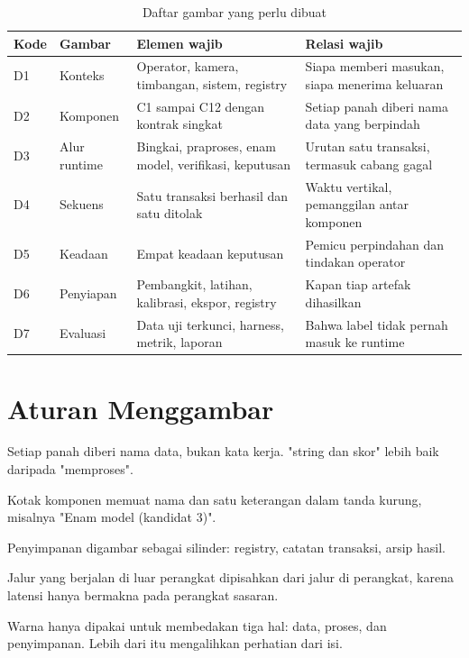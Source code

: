 \documentclass[12pt,a4paper,oneside]{report}
\begin{document}
\begin{table}[H]
\caption{Daftar gambar yang perlu dibuat}
\label{tab:gambar}
\begin{tabularx}{\textwidth}{@{}L{1.0cm} L{3.4cm} L{5.6cm} X@{}}
\toprule
\textbf{Kode} & \textbf{Gambar} & \textbf{Elemen wajib} & \textbf{Relasi wajib} \\
\midrule
D1 & Konteks & Operator, kamera, timbangan, sistem, registry & Siapa memberi masukan, siapa menerima keluaran \\
D2 & Komponen & C1 sampai C12 dengan kontrak singkat & Setiap panah diberi nama data yang berpindah \\
D3 & Alur runtime & Bingkai, praproses, enam model, verifikasi, keputusan & Urutan satu transaksi, termasuk cabang gagal \\
D4 & Sekuens & Satu transaksi berhasil dan satu ditolak & Waktu vertikal, pemanggilan antar komponen \\
D5 & Keadaan & Empat keadaan keputusan & Pemicu perpindahan dan tindakan operator \\
D6 & Penyiapan & Pembangkit, latihan, kalibrasi, ekspor, registry & Kapan tiap artefak dihasilkan \\
D7 & Evaluasi & Data uji terkunci, harness, metrik, laporan & Bahwa label tidak pernah masuk ke runtime \\
\bottomrule
\end{tabularx}
\end{table}

\section{Aturan Menggambar}

\begin{poin}
  \item Setiap panah diberi nama data, bukan kata kerja. "string dan skor" lebih
        baik daripada "memproses".
  \item Kotak komponen memuat nama dan satu keterangan dalam tanda kurung,
        misalnya "Enam model (kandidat 3)".
  \item Penyimpanan digambar sebagai silinder: registry, catatan transaksi,
        arsip hasil.
  \item Jalur yang berjalan di luar perangkat dipisahkan dari jalur di perangkat,
        karena latensi hanya bermakna pada perangkat sasaran.
  \item Warna hanya dipakai untuk membedakan tiga hal: data, proses, dan
        penyimpanan. Lebih dari itu mengalihkan perhatian dari isi.
\end{poin}

\clearpage

\end{document}

